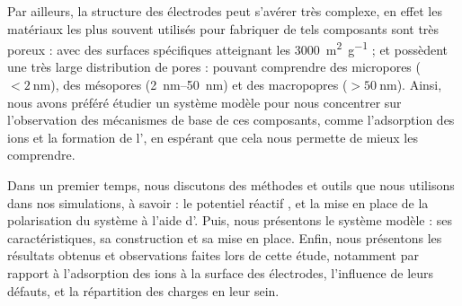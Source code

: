 Par ailleurs, la structure des électrodes peut s'avérer très complexe\cite{bo_design_2018}\cite{iro_brief_2016}, en effet les matériaux les plus souvent utilisés pour fabriquer de tels composants sont très poreux : avec des surfaces spécifiques atteignant les \qty{3000}{\square \meter \per \gram} ; et possèdent une très large distribution de pores : pouvant comprendre des micropores ($< \qty{2}{\nano\meter}$), des mésopores (\qtyrange[range-units = single]{2}{50}{\nano \meter}) et des macropopres ($> \qty{50}{\nano \meter}$).
Ainsi, nous avons préféré étudier un système modèle pour nous concentrer sur l'observation des mécanismes de base de ces composants, comme l'adsorption des ions et la formation de l'\edl{}, en espérant que cela nous permette de mieux les comprendre.

Dans un premier temps, nous discutons des méthodes et outils que nous utilisons dans nos simulations, à savoir : le potentiel réactif \reaxff{}\cite{van_duin_reaxff_2001}\cite{russo_atomistic-scale_2011}\cite{senftle_reaxff_2016}, et la mise en place de la polarisation du système à l'aide d'\echemdid{}\cite{onofrio_voltage_2015}.
Puis, nous présentons le système modèle : ses caractéristiques, sa construction et sa mise en place.
Enfin, nous présentons les résultats obtenus et observations faites lors de cette étude, notamment par rapport à l'adsorption des ions à la surface des électrodes, l'influence de leurs défauts, et la répartition des charges en leur sein.

